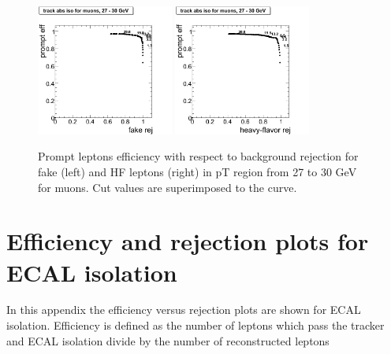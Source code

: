 \begin{figure}[htbp]
\begin{center}
 \includegraphics[width = 0.4\textwidth]{pictures/bkgdRej_sigEff/onlyTrack_muon_fake_ptCut8_ptCut9.png}
\includegraphics[width = 0.4\textwidth]{pictures/bkgdRej_sigEff/onlyTrack_muon_nonPrompt_ptCut8_ptCut9.png}
\caption{\small{Prompt leptons efficiency with respect to background 
rejection for fake (left) and HF leptons (right) in pT region
from 27 to 30 GeV for muons. 
Cut values are superimposed to the curve.}\label{fig:rej_mu9}}
\end{center}
\end{figure}

\clearpage

\section{Efficiency and rejection plots for ECAL isolation}
\label{sec:ecalplots}
In this appendix the efficiency versus rejection plots are shown for ECAL isolation.
 Efficiency is defined as the number of leptons which pass the 
tracker and ECAL isolation divide by the number of reconstructed leptons

